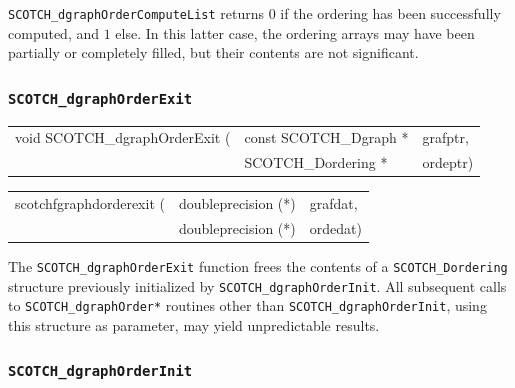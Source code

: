 \begin{itemize}
\progret

\texttt{SCOTCH\_dgraphOrderComputeList} returns $0$ if the ordering
has been successfully computed, and $1$ else. In this latter case, the
ordering arrays may have been partially or completely filled, but
their contents are not significant.
\end{itemize}

\subsubsection{{\tt SCOTCH\_dgraphOrderExit}}

\begin{itemize}
\progsyn

{\tt\begin{tabular}{l@{}ll}
void SCOTCH\_dgraphOrderExit ( & const SCOTCH\_Dgraph * & grafptr, \\
                               & SCOTCH\_Dordering *    & ordeptr)
\end{tabular}}

{\tt\begin{tabular}{l@{}ll}
scotchfgraphdorderexit ( & doubleprecision (*) & grafdat, \\
                         & doubleprecision (*) & ordedat)
\end{tabular}}

\progdes

The {\tt SCOTCH\_dgraphOrderExit} function frees the contents of a
{\tt SCOTCH\_\lbt Dordering} structure previously initialized by
{\tt SCOTCH\_\lbt dgraph\lbt Order\lbt Init}. All subsequent calls to
{\tt SCOTCH\_\lbt dgraph\lbt Order*} routines other than
{\tt SCOTCH\_\lbt dgraph\lbt Order\lbt Init}, using this structure
as parameter, may yield unpredictable results.
\end{itemize}

\subsubsection{{\tt SCOTCH\_dgraphOrderInit}}
\label{sec-lib-func-dgraphorderinit}

